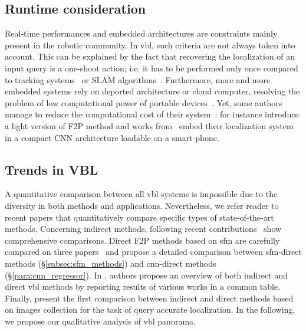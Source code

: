 	\subsection{Runtime consideration}
		\label{subsec:runtime}
		Real-time performances and embedded architectures are constraints mainly present in the robotic community. In \ac{vbl}, such criteria are not always taken into account. This can be explained by the fact that recovering the localization of an input query is a one-shoot action; i.e. it has to be performed only once compared to tracking systems~\citep{Marchand2016} or SLAM algorithms~\citep{Garcia-Fidalgo2015}. Furthermore, more and more embedded systems rely on deported architecture or cloud computer, resolving the problem of low computational power of portable devices~\citep{Middelberg2014}. Yet, some authors manage to reduce the computational cost of their system~\citep{Shotton2013,Glocker2015,Lynen2015}: for instance \citet{Feng2016a} introduce a light version of F2P method and works from~\citep{Weyand2016,Kendall2015,Contreras2017} embed their localization system in a compact CNN architecture loadable on a smart-phone.
			
	\subsection{Trends in VBL}
		\label{subsec:qualitative_comparison}
    	
		A quantitative comparison between all \ac{vbl} systems is impossible due to the diversity in both methods and applications. Nevertheless, we refer reader to recent papers that quantitatively compare specific types of state-of-the-art methods. Concerning indirect methods, following recent contributions~\citep{Radenovic2016,Gordo2016} show comprehensive comparisons. Direct F2P methods based on \ac{sfm} are carefully compared on three papers~\citep{Feng2016a,Sattler2016a,Svarm2016} and \citet{Kendall2017} propose a detailed comparison between \ac{sfm}-direct methods (\S\ref{subsec:sfm_methods}) and \ac{cnn}-direct methods (\S\ref{para:cnn_regressor}). In \citep{Brejcha2017}, authors propose an overview of both indirect and direct \ac{vbl} methods by reporting results of various works in a common table. Finally, \citet{Sattler2017} present the first comparison between indirect and direct methods based on images collection for the task of query accurate localization. In the following, we propose our qualitative analysis of \ac{vbl} panorama. 
        
